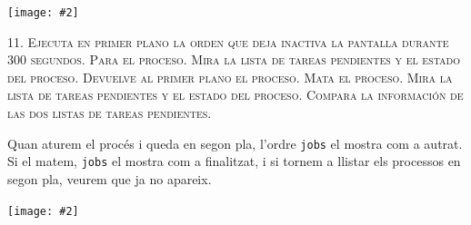 \documentclass[a4paper,12pt]{article}
\newcommand{\mygraphic}[2][height=0.4\textheight]{\begin{center}
		\centering\texttt{[image: \#2]}\par
\end{center}}
\begin{document}
\mygraphic{imatges/8.png}

\newpage
\textsc{11. Ejecuta en primer plano la orden que deja inactiva la pantalla durante 300 segundos. Para el proceso. Mira la lista de tareas pendientes y el estado del proceso. Devuelve al primer plano el proceso. Mata el proceso. Mira la lista de tareas pendientes y el estado del proceso. Compara la información de las dos listas de tareas pendientes.}

Quan aturem el procés i queda en segon pla, l'ordre \texttt{jobs} el mostra com a autrat. Si el matem, \texttt{jobs} el mostra com a finalitzat, i si tornem a llistar els processos en segon pla, veurem que ja no apareix.
\mygraphic[height=0.35\textheight]{imatges/10.png}
\end{document}
